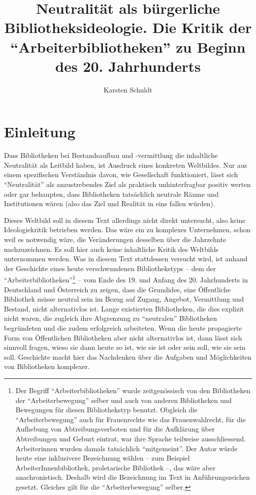 \documentclass[a4paper,
fontsize=11pt,
oneside,
numbers=noperiodatend,
parskip=half-,
bibliography=totoc,
final
]{scrartcl}
\title{\LARGE{Neutralität als bürgerliche Bibliotheksideologie. Die Kritik der \enquote{Arbeiterbibliotheken} zu Beginn des 20. Jahrhunderts}}%
\author{Karsten Schuldt} %
\date{}
\begin{document}
\maketitle
\thispagestyle{fancyplain} 


\hypertarget{einleitung}{%
\section{Einleitung}\label{einleitung}}

Dass Bibliotheken bei Bestandsaufbau und -vermittlung die inhaltliche
Neutralität als Leitbild haben, ist Ausdruck eines konkreten Weltbildes.
Nur aus einem spezifischen Verständnis davon, wie Gesellschaft
funktioniert, lässt sich \enquote{Neutralität} als anzustrebendes Ziel
als praktisch unhinterfragbar positiv werten oder gar behaupten, dass
Bibliotheken tatsächlich neutrale Räume und Institutionen wären (also
das Ziel und Realität in eins fallen würden).

Dieses Weltbild soll in diesem Text allerdings nicht direkt untersucht,
also keine Ideologiekritik betrieben werden. Das wäre ein zu komplexes
Unternehmen, schon weil es notwendig wäre, die Veränderungen desselben
über die Jahrzehnte nachzuzeichnen. Es soll hier auch keine inhaltliche
Kritik des Weltbilds unternommen werden. Was in diesem Text stattdessen
versucht wird, ist anhand der Geschichte eines heute verschwundenen
Bibliothekstyps -- dem der \enquote{Arbeiterbibliotheken}\footnote{Der
  Begriff \enquote{Arbeiterbibliotheken} wurde zeitgenössisch von den
  Bibliotheken der \enquote{Arbeiterbewegung} selber und auch von
  anderen Bibliotheken und Bewegungen für diesen Bibliothekstyp benutzt.
  Obgleich die \enquote{Arbeiterbewegung} auch für Frauenrechte wie das
  Frauenwahlrecht, für die Aufhebung von Abtreibungsverboten und für die
  Aufklärung über Abtreibungen und Geburt eintrat, war ihre Sprache
  teilweise ausschliessend. Arbeiterinnen wurden damals tatsächlich
  \enquote{mitgemeint}. Der Autor würde heute eine inklusivere
  Bezeichnung wählen -- zum Beispiel ArbeiterInnenbibliothek,
  proletarische Bibliothek --, das wäre aber anachronistisch. Deshalb
  wird die Bezeichnung im Text in Anführungszeichen gesetzt. Gleiches
  gilt für die \enquote{Arbeiterbewegung} selber.} -- vom Ende des 19.
und Anfang des 20. Jahrhunderts in Deutschland und Österreich zu zeigen,
dass die Grundidee, eine Öffentliche Bibliothek müsse neutral sein im
Bezug auf Zugang, Angebot, Vermittlung und Bestand, nicht alternativlos
ist. Lange existierten Bibliotheken, die dies explizit nicht waren, die
zugleich ihre Abgrenzung zu \enquote{neutralen} Bibliotheken begründeten
und die zudem erfolgreich arbeiteten. Wenn die heute propagierte Form
von Öffentlichen Bibliotheken aber nicht alternativlos ist, dann lässt
sich sinnvoll fragen, wieso sie dann heute so ist, wie sie ist oder sein
soll, wie sie sein soll. Geschichte macht hier das Nachdenken über die
Aufgaben und Möglichkeiten von Bibliotheken komplexer.
\end{document}
